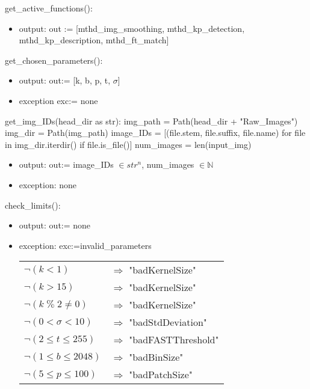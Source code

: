 \documentclass[12pt, titlepage]{article}
\begin{document}
\noindent get\_active\_functions():
\begin{itemize}
  \item output: out := [mthd\_img\_smoothing, mthd\_kp\_detection, 
  mthd\_kp\_description, mthd\_ft\_match] 
\end{itemize}


\noindent get\_chosen\_parameters():
\begin{itemize}
  \item output: out:= [k, b, p, t,  $\sigma$]
  \item exception exc:= none
\end{itemize}


\noindent get\_img\_IDs(head\_dir as str): \newline \newline
img\_path = Path(head\_dir + "Raw\_Images") \newline
img\_dir = Path(img\_path) \newline
image\_IDs = [(file.stem, file.suffix, file.name) 
for file in img\_dir.iterdir() if file.is\_file()] \newline
num\_images = len(input\_img)
\begin{itemize}
\item output: out:= image\_IDs $\in str^{n}$, num\_images $\in \mathbb{N}$
\item exception: none 
\end{itemize}


\noindent check\_limits():
\begin{itemize}
  \item output: out:= none
  \item exception: exc:=invalid\_parameters\
  \noindent \begin{longtable*}[l]{l l} 
    $\neg (k < 1)$ & $\Rightarrow$ "badKernelSize"\\
    $\neg (k > 15)$ & $\Rightarrow$ "badKernelSize"\\
    $\neg (k \; \% \; 2 \neq 0)$ & $\Rightarrow$ "badKernelSize"\\
    $\neg (0 < \sigma < 10)$ & $\Rightarrow$ "badStdDeviation"\\
    $\neg (2 \leq t \leq 255)$ & $\Rightarrow$ "badFASTThreshold"\\
    $\neg (1 \leq b \leq 2048)$ & $\Rightarrow$ "badBinSize"\\
    $\neg (5 \leq p \leq 100)$ & $\Rightarrow$ "badPatchSize"\\
    \end{longtable*}
\end{itemize}
\end{document}
